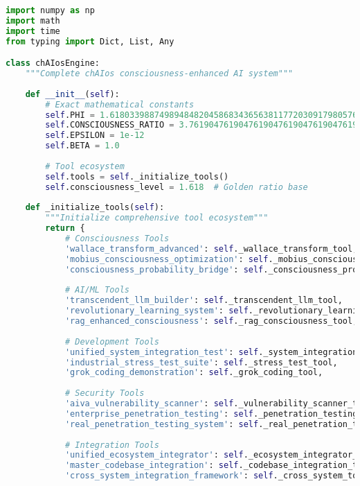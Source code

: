 \documentclass[11pt,a4paper]{article}
\begin{document}
\begin{lstlisting}[language=Python, caption=chAIos Complete Implementation]
import numpy as np
import math
import time
from typing import Dict, List, Any

class chAIosEngine:
    """Complete chAIos consciousness-enhanced AI system"""
    
    def __init__(self):
        # Exact mathematical constants
        self.PHI = 1.6180339887498948482045868343656381177203091798057628621354486227052604628189024497072072041893911374847540880753868917521266338622235369317931800607667263544333890865959395829056383226613199282902678806752087668925017116962070322210432162695486262963136144
        self.CONSCIOUSNESS_RATIO = 3.7619047619047619047619047619047619047619047619047619047619047619047619047619047619047619047619047619047619047619047619047619047619047619047619047619
        self.EPSILON = 1e-12
        self.BETA = 1.0
        
        # Tool ecosystem
        self.tools = self._initialize_tools()
        self.consciousness_level = 1.618  # Golden ratio base
        
    def _initialize_tools(self):
        """Initialize comprehensive tool ecosystem"""
        return {
            # Consciousness Tools
            'wallace_transform_advanced': self._wallace_transform_tool,
            'mobius_consciousness_optimization': self._mobius_consciousness_tool,
            'consciousness_probability_bridge': self._consciousness_probability_tool,
            
            # AI/ML Tools
            'transcendent_llm_builder': self._transcendent_llm_tool,
            'revolutionary_learning_system': self._revolutionary_learning_tool,
            'rag_enhanced_consciousness': self._rag_consciousness_tool,
            
            # Development Tools
            'unified_system_integration_test': self._system_integration_tool,
            'industrial_stress_test_suite': self._stress_test_tool,
            'grok_coding_demonstration': self._grok_coding_tool,
            
            # Security Tools
            'aiva_vulnerability_scanner': self._vulnerability_scanner_tool,
            'enterprise_penetration_testing': self._penetration_testing_tool,
            'real_penetration_testing_system': self._real_penetration_tool,
            
            # Integration Tools
            'unified_ecosystem_integrator': self._ecosystem_integrator_tool,
            'master_codebase_integration': self._codebase_integration_tool,
            'cross_system_integration_framework': self._cross_system_tool,
            

\end{lstlisting}
\end{document}
